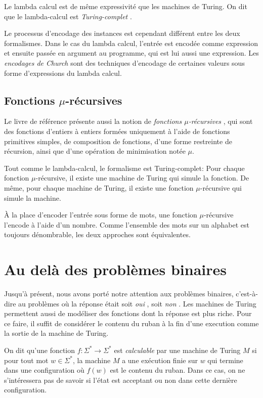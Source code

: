 Le lambda calcul est de même expressivité que les machines de Turing.
On dit que le lambda-calcul est \og \textit{Turing-complet} \fg{}.

Le processus d'encodage des instances est cependant différent entre les deux formalismes.
Dans le cas du lambda calcul, l'entrée est encodée comme expression et ensuite passée en argument au programme, qui est lui aussi une expression.
Les \og \textit{encodages de Church} \fg{} sont des techniques d'encodage de certaines valeurs sous forme d'expressions du lambda calcul.

\subsection{Fonctions $\mu$-récursives}

Le livre de référence présente aussi la notion de \og \textit{fonctions $\mu$-récursives} \fg{}, qui sont des fonctions d'entiers à entiers formées uniquement à l'aide de fonctions primitives simples, de composition de fonctions, d'une forme restreinte de récursion, ainsi que d'une opération de minimisation notée $\mu$.

Tout comme le lambda-calcul, le formalisme est Turing-complet:
Pour chaque fonction $\mu$-récursive, il existe une machine de Turing qui simule la fonction.
De même, pour chaque machine de Turing, il existe une fonction $\mu$-récursive qui simule la machine.

À la place d'encoder l'entrée sous forme de mots, une fonction $\mu$-récursive l'encode à l'aide d'un nombre.
Comme l'ensemble des mots sur un alphabet est toujours dénombrable, les deux approches sont équivalentes.

\section{Au delà des problèmes binaires}

Jusqu'à présent, nous avons porté notre attention aux problèmes binaires, c'est-à-dire au problèmes où la réponse était soit \og \textit{oui} \fg{}, soit \og \textit{non} \fg{}.
Les machines de Turing permettent aussi de modéliser des fonctions dont la réponse est plus riche.
Pour ce faire, il suffit de considérer le contenu du ruban à la fin d'une execution comme la sortie de la machine de Turing.

On dit qu'une fonction $f : \Sigma^* \to \Sigma^*$ est \og \textit{calculable} \fg{} par une machine de Turing $M$ si pour tout mot $w \in \Sigma^*$, la machine $M$ a une exécution finie sur $w$ qui termine dans une configuration où $f(w)$ est le contenu du ruban.
Dans ce cas, on ne s'intéressera pas de savoir si l'état est acceptant ou non dans cette dernière configuration.

